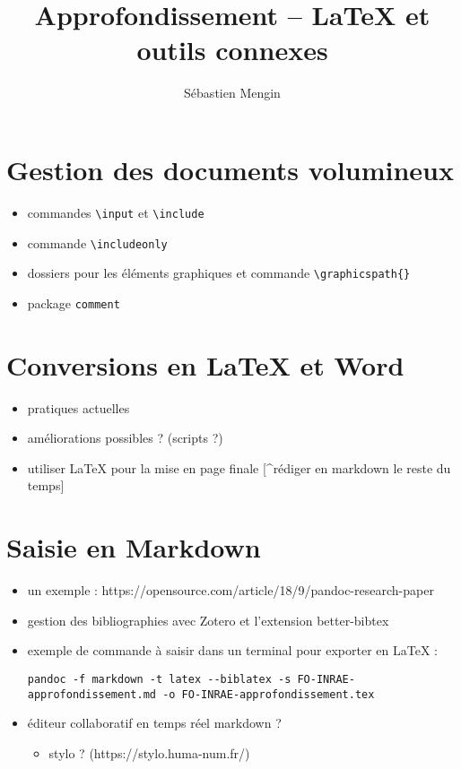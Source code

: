 \documentclass[
]{article}
\title{Approfondissement -- LaTeX et outils connexes}
\author{Sébastien Mengin}
\date{}
\providecommand{\tightlist}{%
  \setlength{\itemsep}{0pt}\setlength{\parskip}{0pt}}
\begin{document}
\maketitle

\hypertarget{gestion-des-documents-volumineux}{%
\section{Gestion des documents
volumineux}\label{gestion-des-documents-volumineux}}

\begin{itemize}
\tightlist
\item
  commandes \texttt{\textbackslash{}input} et
  \texttt{\textbackslash{}include}
\item
  commande \texttt{\textbackslash{}includeonly}
\item
  dossiers pour les éléments graphiques et commande
  \texttt{\textbackslash{}graphicspath\{\}}
\item
  package \texttt{comment}
\end{itemize}

\hypertarget{conversions-en-latex-et-word}{%
\section{Conversions en LaTeX et
Word}\label{conversions-en-latex-et-word}}

\begin{itemize}
\tightlist
\item
  pratiques actuelles
\item
  améliorations possibles ? (scripts ?)
\item
  utiliser LaTeX pour la mise en page finale {[}\^{}rédiger en markdown
  le reste du temps{]}
\end{itemize}

\hypertarget{saisie-en-markdown}{%
\section{Saisie en Markdown}\label{saisie-en-markdown}}

\begin{itemize}
\item
  un exemple : https://opensource.com/article/18/9/pandoc-research-paper
\item
  gestion des bibliographies avec Zotero et l'extension better-bibtex
  \autocite{smith2023economic}
\item
  exemple de commande à saisir dans un terminal pour exporter en LaTeX :

\begin{verbatim}
pandoc -f markdown -t latex --biblatex -s FO-INRAE-approfondissement.md -o FO-INRAE-approfondissement.tex
\end{verbatim}
\item
  éditeur collaboratif en temps réel markdown ?

  \begin{itemize}
  \tightlist
  \item
    stylo ? (https://stylo.huma-num.fr/)
  \end{itemize}
\end{itemize}
\end{document}
